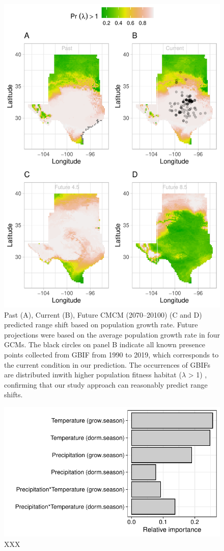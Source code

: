 \documentclass[12pt]{article}
\begin{document}
\begin{figure}%
  \begin{center}
    \includegraphics[width=0.78\linewidth]{Figures/Fig_geoPrlambdaprojectioncmc.pdf}
  \caption{Past (A), Current (B), Future CMCM (2070–20100) (C and D) predicted range shift based on population growth rate. Future projections were based on the average population growth rate in four GCMs. The black circles on panel B indicate all known presence points collected from GBIF from 1990 to 2019, which corresponds to the current condition in our prediction.  The occurrences of GBIFs are distributed inwith higher population fitness habitat ($\lambda$ > 1) , confirming that our study approach can reasonably predict range shifts. }
  \label{fig:geoproj}
  \end{center}
\end{figure}

\begin{figure}[h!]
  \begin{center}
    \includegraphics[width=0.85\linewidth]{Figures/Fig_LTRE.pdf}
  \caption{XXX}
  \label{Sup:LTRE}
  \end{center}
\end{figure}
\end{document}
